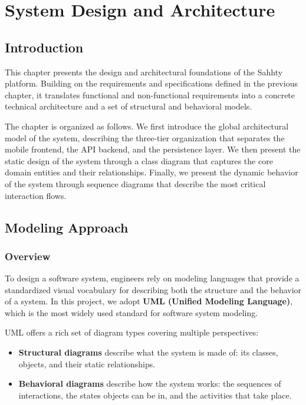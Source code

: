 \chapter{System Design and Architecture}

\section{Introduction}

This chapter presents the design and architectural foundations of the Sahhty platform. Building on the requirements and specifications defined in the previous chapter, it translates functional and non-functional requirements into a concrete technical architecture and a set of structural and behavioral models.

The chapter is organized as follows. We first introduce the global architectural model of the system, describing the three-tier organization that separates the mobile frontend, the API backend, and the persistence layer. We then present the static design of the system through a class diagram that captures the core domain entities and their relationships. Finally, we present the dynamic behavior of the system through sequence diagrams that describe the most critical interaction flows.

\section{Modeling Approach}

\subsection{Overview}

To design a software system, engineers rely on modeling languages that provide a standardized visual vocabulary for describing both the structure and the behavior of a system. In this project, we adopt \textbf{UML (Unified Modeling Language)}, which is the most widely used standard for software system modeling.

UML offers a rich set of diagram types covering multiple perspectives:
\begin{itemize}
    \item \textbf{Structural diagrams} describe what the system is made of: its classes, objects, and their static relationships.
    \item \textbf{Behavioral diagrams} describe how the system works: the sequences of interactions, the states objects can be in, and the activities that take place.
\end{itemize}

